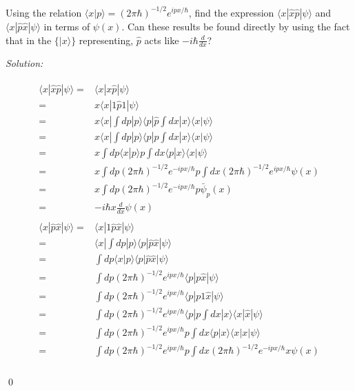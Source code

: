 \documentclass[12pt,a4paper]{article}
\newenvironment{problem}[2][Problem]{\begin{trivlist}
\item[\hskip \labelsep {\bfseries #1}\hskip \labelsep {\bfseries #2.}]}{\end{trivlist}}
\newenvironment{sol}
    {\emph{Solution:}
    }
    {
    \qed
    }
\begin{document}
\begin{problem}{5}
[C-T Exercise 2-10] Using the relation $\langle x|p\rangle=(2\pi\hbar)^{-1/2}e^{ipx/\hbar}$, find the expression $\langle x|\hat{x}\hat{p}|\psi\rangle$ and $\langle x|\hat{p}\hat{x}|\psi\rangle$ in terms of $\psi(x)$. Can these results be found directly by using the fact that in the $\{|x\rangle\}$ representing, $\hat{p}$ acts like $-i\hbar\frac{d}{dx}$?
\end{problem}
\begin{sol}
\begin{gather}
\begin{align}
\nonumber\langle x|\hat{x}\hat{p}|\psi\rangle=&\langle x|x\hat{p}|\psi\rangle\\
\nonumber=&x\langle x|1\hat{p}1|\psi\rangle\\
\nonumber=&x\langle x|\int dp|p\rangle\langle p|\hat{p}\int dx|x\rangle\langle x|\psi\rangle\\
\nonumber=&x\langle x|\int dp|p\rangle\langle p|p\int dx|x\rangle\langle x|\psi\rangle\\
\nonumber=&x\int dp\langle x|p\rangle p\int dx\langle p|x\rangle\langle x|\psi\rangle\\
\nonumber=&x\int dp(2\pi\hbar)^{-1/2}e^{-ipx/\hbar}p\int dx(2\pi\hbar)^{-1/2}e^{ipx/\hbar}\psi(x)\\
\nonumber=&x\int dp(2\pi\hbar)^{-1/2}e^{-ipx/\hbar}p\bar{\psi}_p(x)\\
=&-i\hbar x\frac{d}{dx}\psi(x)
\end{align}\\
\begin{align}
\nonumber\langle x|\hat{p}\hat{x}|\psi\rangle=&\langle x|1\hat{p}\hat{x}|\psi\rangle\\
\nonumber=&\langle x|\int dp|p\rangle\langle p|\hat{p}\hat{x}|\psi\rangle\\
\nonumber=&\int dp\langle x|p\rangle\langle p|\hat{p}\hat{x}|\psi\rangle\\
\nonumber=&\int dp(2\pi\hbar)^{-1/2}e^{ipx/\hbar}\langle p|p\hat{x}|\psi\rangle\\
\nonumber=&\int dp(2\pi\hbar)^{-1/2}e^{ipx/\hbar}\langle p|p1\hat{x}|\psi\rangle\\
\nonumber=&\int dp(2\pi\hbar)^{-1/2}e^{ipx/\hbar}\langle p|p\int dx|x\rangle\langle x|\hat{x}|\psi\rangle\\
\nonumber=&\int dp(2\pi\hbar)^{-1/2}e^{ipx/\hbar}p\int dx\langle p|x\rangle\langle x|x|\psi\rangle\\
\nonumber=&\int dp(2\pi\hbar)^{-1/2}e^{ipx/\hbar}p\int dx(2\pi\hbar)^{-1/2}e^{-ipx/\hbar}x\psi(x)\\

\end{align}
\end{gather}
\end{sol}
\end{document}
